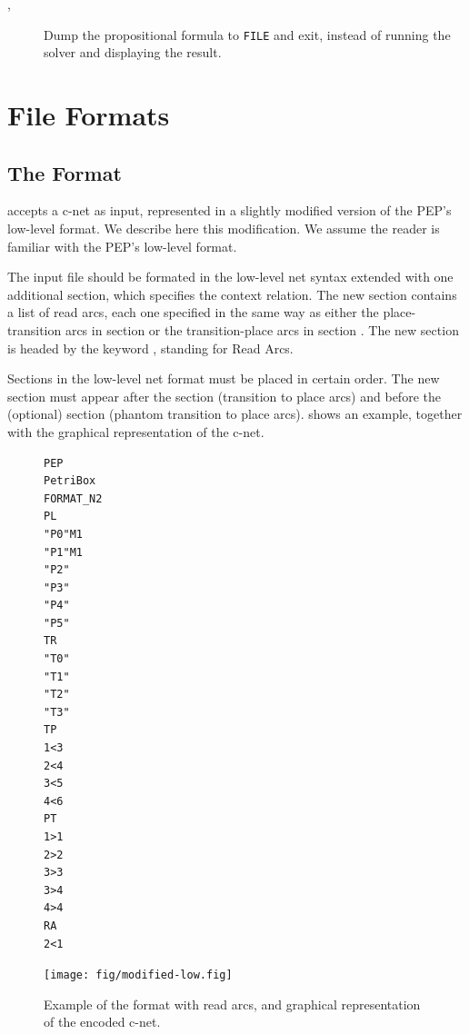 \documentclass[a4paper]{refart}
\begin{document}
\begin{description}
\item[, ]
  Dump the propositional formula to \verb!FILE! and exit, instead of
  running the solver and displaying the result.

\end{description}

\section{File Formats}%
\label{s:formats}

\subsection{The  Format}%
\label{s:iformat}

\cunf accepts a c-net as input, represented in a slightly modified version
of the PEP's low-level format.  We describe here this modification.  We
assume the reader is familiar with the PEP's low-level format\cite{PEP,B98}.

The input file should be formated in the low-level net syntax extended with
one additional section, which specifies the context relation.  The new
section contains a list of read arcs, each one specified in the same way as
either the place-transition arcs in section  or the
transition-place arcs in section .  The new section is headed by the
keyword , standing for Read Arcs.  

Sections in the low-level net format must be placed in certain order.  The
new  section must appear after the section  (transition to
place arcs) and before the (optional) section  (phantom transition
to place arcs).   shows an example, together with the
graphical representation of the c-net.

\begin{figure}[bth]
\begin{center}
\begin{minipage}{.3\textwidth}
\footnotesize
\begin{verbatim}
PEP
PetriBox
FORMAT_N2
PL
"P0"M1
"P1"M1
"P2"
"P3"
"P4"
"P5"
TR
"T0"
"T1"
"T2"
"T3"
TP
1<3
2<4
3<5
4<6
PT
1>1
2>2
3>3
3>4
4>4
RA
2<1
\end{verbatim}
\end{minipage}
\begin{minipage}{5cm}
\texttt{[image: fig/modified-low.fig]}
\end{minipage}
\end{center}
\caption{Example of the  format with read arcs,
and graphical representation of the encoded c-net.}
\label{f:modified.low}
\end{figure}
\end{document}
